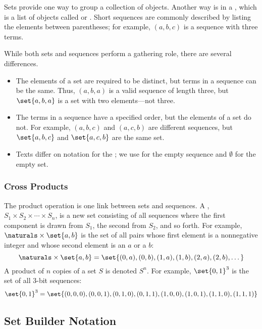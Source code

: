 Sets provide one way to group a collection of objects.  Another way is
in a , which is a list of objects called 
or .  Short sequences are commonly described by
listing the elements between parentheses; for example, $(a, b, c)$ is
a sequence with three terms.

While both sets and sequences perform a gathering role, there are
several differences.
\begin{itemize}

\item The elements of a set are required to be distinct, but terms in a
sequence can be the same.  Thus, $(a, b, a)$ is a valid sequence of length
three, but $\set{a, b, a}$ is a set with two elements---not three.

\item The terms in a sequence have a specified order, but the elements
of a set do not.  For example, $(a, b, c)$ and $(a, c, b)$ are
different sequences, but $\set{a, b, c}$ and $\set{a, c, b}$ are the
same set.

\item Texts differ on notation for the ; we use
  \term{$\lambda$} for the empty sequence and $\emptyset$ for the
  empty set.
\end{itemize}

\subsubsection{Cross Products}

The product operation is one link between sets and sequences.  A
, $S_1 \times S_2 \times \cdots \times S_n$, is a
new set consisting of all sequences where the first component is drawn
from $S_1$, the second from $S_2$, and so forth.  For example, $\naturals
\times \set{a,b}$ is the set of all pairs whose first element is a
nonnegative integer and whose second element is an $a$ or a $b$:
\[
\naturals \times \set{a,b}
    = \set{(0,a), (0,b), (1,a), (1,b), (2,a), (2, b), \dots}
\]
A product of $n$ copies of a set $S$ is denoted $S^n$.  For example,
$\set{0, 1}^3$ is the set of all $3$-bit sequences:
\[
\set{0, 1}^3 = \set{ (0,0,0), (0,0,1), (0,1,0), (0,1,1),
                     (1,0,0), (1,0,1), (1,1,0), (1,1,1) }
\]

\subsection{Set Builder Notation}\label{sec:set_builder_notation}


